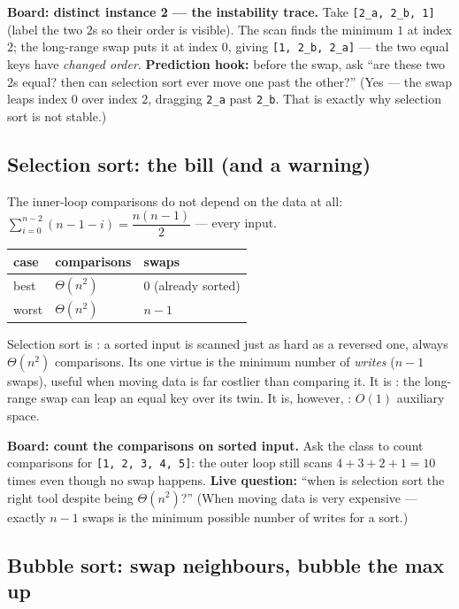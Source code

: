\documentclass[11pt]{article}
\begin{document}
\textbf{Board: distinct instance 2 --- the instability trace.} Take \texttt{[2\_a, 2\_b, 1]} (label the two $2$s so their order is visible). The scan finds the minimum $1$ at index $2$; the long-range swap puts it at index $0$, giving \texttt{[1, 2\_b, 2\_a]} --- the two equal keys have \emph{changed order}. \textbf{Prediction hook:} before the swap, ask ``are these two $2$s equal? then can selection sort ever move one past the other?'' (Yes --- the swap leaps index $0$ over index $2$, dragging \texttt{2\_a} past \texttt{2\_b}. That is exactly why selection sort is not stable.)

\subsection{Selection sort: the bill (and a warning)}

The inner-loop comparisons do not depend on the data at all: $\sum_{i=0}^{n-2} (n-1-i) = \dfrac{n(n-1)}{2}$ --- every input.

\begin{center}
{\footnotesize
\begin{tabular}{lll}
  \toprule
  \textbf{case} & \textbf{comparisons} & \textbf{swaps} \\
  \midrule
  best & $\Theta(n^2)$ & $0$ (already sorted) \\
  worst & $\Theta(n^2)$ & $n-1$ \\
  \bottomrule
\end{tabular}}
\end{center}

Selection sort is : a sorted input is scanned just as hard as a reversed one, always $\Theta(n^2)$ comparisons. Its one virtue is the minimum number of \emph{writes} ($n-1$ swaps), useful when moving data is far costlier than comparing it. It is : the long-range swap can leap an equal key over its twin. It is, however, : $O(1)$ auxiliary space.

\textbf{Board: count the comparisons on sorted input.} Ask the class to count comparisons for \texttt{[1, 2, 3, 4, 5]}: the outer loop still scans $4 + 3 + 2 + 1 = 10$ times even though no swap happens. \textbf{Live question:} ``when is selection sort the right tool despite being $\Theta(n^2)$?'' (When moving data is very expensive --- exactly $n-1$ swaps is the minimum possible number of writes for a sort.)

\subsection{Bubble sort: swap neighbours, bubble the max up}
\end{document}
